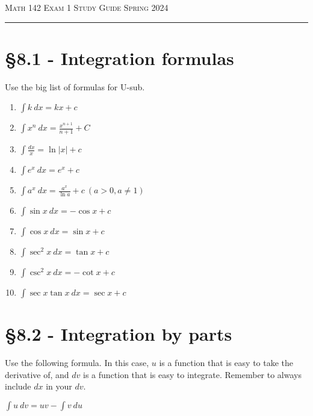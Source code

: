 \documentclass{article}
\begin{document}
\noindent
{\scshape Math 142} \hfill {\scshape Exam 1 Study Guide} \hfill {\scshape Spring 2024}

\smallskip

\hrule

\bigskip

\begin{multicols}{2}
\section*{\S 8.1 - Integration formulas}

Use the big list of formulas for U-sub.

{
\large

\begin{enumerate}

\item
$\int k~dx=kx+c$

\item
$\int x^n~dx=\frac{x^{n+1}}{n+1}+C$

\item
$\int \frac{dx}{x}=\ln|x|+c$

\item
$\int e^x~dx=e^x+c$

\item
$\int a^x~dx=\frac{a^x}{\ln a}+c~(a>0,a \neq 1)$

\item
$\int \sin x~dx=-\cos x+c$

\item
$\int \cos x~dx=\sin x+c$

\item
$\int \sec^2 x~dx=\tan x+c$

\item
$\int \csc^2 x~dx=-\cot x+c$

\item
$\int \sec x \tan x~dx=\sec x+c$

\end{enumerate}
}

\section*{\S 8.2 - Integration by parts}

Use the following formula.
In this case, $u$ is a function that is easy to take the derivative of,
and $dv$ is a function that is easy to integrate.
Remember to always include $dx$ in your $dv$.

\begin{center}
\huge
$\int u~dv=uv-\int v~du$
\end{center}


\end{multicols}
\end{document}
